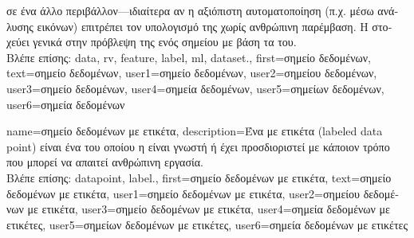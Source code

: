 {{ 		 \foreignlanguage{greek}{σε ένα άλλο περιβάλλον—ιδιαίτερα αν η αξιόπιστη αυτοματοποίηση  
 		(π.χ. μέσω ανάλυσης εικόνων) επιτρέπει τον υπολογισμό της χωρίς ανθρώπινη παρέμβαση. Η}  
   		\foreignlanguage{greek}{στοχεύει γενικά στην πρόβλεψη της}  \foreignlanguage{greek}{ενός σημείου} 
		 \foreignlanguage{greek}{με βάση τα}  \foreignlanguage{greek}{του}. 
		\\
		\foreignlanguage{greek}{Βλέπε επίσης:} \gls{data}, \gls{rv}, \gls{feature}, \gls{label}, \gls{ml}, \gls{dataset}.}, 
	first={\foreignlanguage{greek}{σημείο δεδομένων}},
	text={\foreignlanguage{greek}{σημείο δεδομένων}},
	user1={\foreignlanguage{greek}{ση\-μεί\-ο δεδομένων}}, %
	user2={\foreignlanguage{greek}{ση\-μεί\-ου δεδομένων}}, %
	user3={\foreignlanguage{greek}{σημείο δεδομένων}}, %
	user4={\foreignlanguage{greek}{ση\-μεί\-α δεδομένων}}, %
	user5={\foreignlanguage{greek}{ση\-μεί\-ων δεδομένων}}, %
	user6={\foreignlanguage{greek}{ση\-μεί\-α δεδομένων}} %
}

{name={\foreignlanguage{greek}{σημείο δεδομένων με ετικέτα}},
 	description={\foreignlanguage{greek}{Ένα}  \foreignlanguage{greek}{με 
		ετικέτα} (labeled data point) \foreignlanguage{greek}{είναι ένα} 
		 \foreignlanguage{greek}{του οποίου η}  \foreignlanguage{greek}{είναι γνωστή 
		ή έχει προσδιοριστεί με κάποιον τρόπο που μπορεί να απαιτεί ανθρώπινη εργασία.} 
		\\
		\foreignlanguage{greek}{Βλέπε επίσης:} \gls{datapoint}, \gls{label}.},
 	first={\foreignlanguage{greek}{ση\-μεί\-ο δεδομένων με ετικέτα}},
 	text={\foreignlanguage{greek}{ση\-μεί\-ο δεδομένων με ετικέτα}},
 	user1={\foreignlanguage{greek}{σημείο δεδομένων με ετικέτα}}, %
 	user2={\foreignlanguage{greek}{σημείου δεδομένων με ετικέτα}}, %
 	user3={\foreignlanguage{greek}{σημείο δεδομένων με ετικέτα}}, %
 	user4={\foreignlanguage{greek}{σημεία δεδομένων με ετικέτες}}, %
 	user5={\foreignlanguage{greek}{σημείων δεδομένων με ετικέτες}}, %
 	user6={\foreignlanguage{greek}{σημεία δεδομένων με ετικέτες}} %
}%

